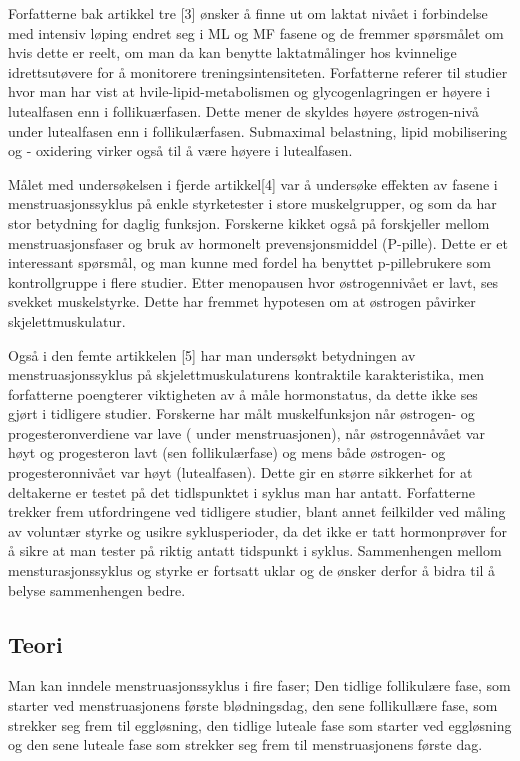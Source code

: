\documentclass[
  letterpaper,
  DIV=11,
  numbers=noendperiod]{scrreprt}
\begin{document}
Forfatterne bak artikkel tre {[}3{]} ønsker å finne ut om laktat nivået
i forbindelse med intensiv løping endret seg i ML og MF fasene og de
fremmer spørsmålet om hvis dette er reelt, om man da kan benytte
laktatmålinger hos kvinnelige idrettsutøvere for å monitorere
treningsintensiteten. Forfatterne referer til studier hvor man har vist
at hvile-lipid-metabolismen og glycogenlagringen er høyere i lutealfasen
enn i follikuærfasen. Dette mener de skyldes høyere østrogen-nivå under
lutealfasen enn i follikulærfasen. Submaximal belastning, lipid
mobilisering og - oxidering virker også til å være høyere i lutealfasen.

Målet med undersøkelsen i fjerde artikkel{[}4{]} var å undersøke
effekten av fasene i menstruasjonssyklus på enkle styrketester i store
muskelgrupper, og som da har stor betydning for daglig funksjon.
Forskerne kikket også på forskjeller mellom menstruasjonsfaser og bruk
av hormonelt prevensjonsmiddel (P-pille). Dette er et interessant
spørsmål, og man kunne med fordel ha benyttet p-pillebrukere som
kontrollgruppe i flere studier. Etter menopausen hvor østrogennivået er
lavt, ses svekket muskelstyrke. Dette har fremmet hypotesen om at
østrogen påvirker skjelettmuskulatur.

Også i den femte artikkelen {[}5{]} har man undersøkt betydningen av
menstruasjonssyklus på skjelettmuskulaturens kontraktile karakteristika,
men forfatterne poengterer viktigheten av å måle hormonstatus, da dette
ikke ses gjørt i tidligere studier. Forskerne har målt muskelfunksjon
når østrogen- og progesteronverdiene var lave ( under menstruasjonen),
når østrogennåvået var høyt og progesteron lavt (sen follikulærfase) og
mens både østrogen- og progesteronnivået var høyt (lutealfasen). Dette
gir en større sikkerhet for at deltakerne er testet på det tidlspunktet
i syklus man har antatt. Forfatterne trekker frem utfordringene ved
tidligere studier, blant annet feilkilder ved måling av voluntær styrke
og usikre syklusperioder, da det ikke er tatt hormonprøver for å sikre
at man tester på riktig antatt tidspunkt i syklus. Sammenhengen mellom
mensturasjonssyklus og styrke er fortsatt uklar og de ønsker derfor å
bidra til å belyse sammenhengen bedre.

\hypertarget{teori}{%
\subsection{Teori}\label{teori}}

Man kan inndele menstruasjonssyklus i fire faser; Den tidlige
follikulære fase, som starter ved menstruasjonens første blødningsdag,
den sene follikullære fase, som strekker seg frem til eggløsning, den
tidlige luteale fase som starter ved eggløsning og den sene luteale fase
som strekker seg frem til menstruasjonens første dag.
\end{document}
